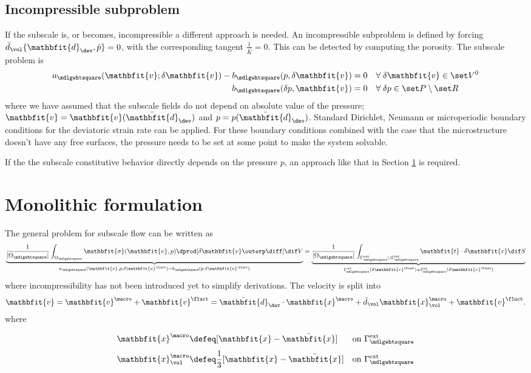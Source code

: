 \documentclass[a4paper,11pt]{article}
\renewcommand{\ta}[1]{\mathbfit{#1}}
\renewcommand{\ts}[1]{\mathbfit{#1}}
\renewcommand{\Box}{\mdlgwhtsquare}
\newcommand{\internal}{\mathrm{int}}
\newcommand{\external}{\mathrm{ext}}
\begin{document}
\subsection{Incompressible subproblem} \label{sec:nested_incompressible}
If the subscale is, or becomes, incompressible a different approach is needed.
An incompressible subproblem is defined by forcing $\bar{d}_\vol\{\ts d_\dev,\bar{p}\} = 0$, with the corresponding tangent $\frac{1}{\bar{K}} = 0$.
This can be detected by computing the porosity.
The subscale problem is
\begin{align}
 a_\Box(\ta v; \delta\ta v) - b_\Box(p,\delta\ta v) &= 0\quad \forall\;\delta\ta v \in \set V^0 \\
 b_\Box(\delta p, \ta v) &= 0\quad \forall\;\delta p \in \set P\setminus\set R
\end{align}
where we have assumed that the subscale fields do not depend on absolute value of the pressure; $\ta v = \ta v(\bar{\ts d}_\dev)$ and $p = p(\bar{\ts d}_\dev)$.
Standard Dirichlet, Neumann  or microperiodic boundary conditions for the deviatoric strain rate can be applied.
For these boundary conditions combined with the case that the microstructure doesn't have any free surfaces, 
the pressure needs to be set at some point to make the system solvable.

If the the subscale constitutive behavior directly depends on the pressure $p$, an approach like that in Section \ref{sec:monolithic} is required.

\section{Monolithic formulation} \label{sec:monolithic}
The general problem for subscale flow can be written as
\begin{align}
 \underbrace{\frac{1}{|\Omega_\Box|} \int_{\Omega_\Box} \ts\sigma(\ta v, p)\dprod [\delta\ta v\outerp\diff] \dif V}_{a_\Box(\ta v,p;\delta\ta v^\fluct)-b_\Box(p,\delta\ta v^\fluct)}
	= \underbrace{\frac{1}{|\Omega_\Box|} \int_{\Gamma_\Box^\external \cup \Gamma_\Box^\internal} \ta t\cdot \delta\ta v\dif S}_{l_\Box^\external(\delta\ta v^\fluct)+l_\Box^\internal(\delta \ta v^\fluct)}
 \label{eq:subscale_original}
\end{align}
where incompressibility has not been introduced yet to simplify derivations.
The velocity is split into
\begin{align}
 \ta v = \ta v^\macro + \ta v^\fluct = \bar{\ts d}_\dev \cdot \ta x^\macro + \bar{d}_\vol \ta x_\vol^\macro + \ta v^\fluct.
\end{align}
where
\begin{align}
 \ta x^\macro \defeq& [\ta x - \bar{\ta x}]\phantom{\frac13} \quad\text{on } \Gamma_\Box^\external
 \label{eq:basefunction}
\\
\ta x_\vol^\macro \defeq & \frac13[\ta x - \bar{\ta x}] \quad\text{on } \Gamma_\Box^\external
 \label{eq:basefunction_vol}
\end{align}
 
\end{document}
